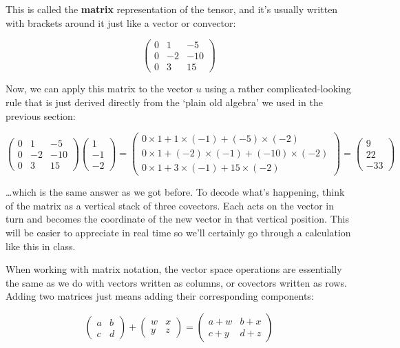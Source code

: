 \documentclass[oneside,english]{amsbook}
\numberwithin{section}{chapter}
\theoremstyle{plain}
\theoremstyle{definition}
\begin{document}
This is called the \textbf{matrix} representation of the tensor, and
it's usually written with brackets around it just like a vector or
convector:

\[\begin{pmatrix}
	0 & 1 & - 5 \\
	0 & - 2 & - 10 \\
	0 & 3 & 15
\end{pmatrix}\]

Now, we can apply this matrix to the vector $u$ using a rather
complicated-looking rule that is just derived directly from the `plain
old algebra' we used in the previous section:

\[\begin{pmatrix}
	0 & 1 & - 5 \\
	0 & - 2 & - 10 \\
	0 & 3 & 15
\end{pmatrix}\begin{pmatrix}
	1 \\
	- 1 \\
	- 2
\end{pmatrix} = \begin{pmatrix}
	0 \times 1 + 1 \times ( - 1) + ( - 5) \times ( - 2) \\
	0 \times 1 + ( - 2) \times ( - 1) + ( - 10) \times ( - 2) \\
	0 \times 1 + 3 \times ( - 1) + 15 \times ( - 2)
\end{pmatrix} = \begin{pmatrix}
	9 \\
	22 \\
	- 33
\end{pmatrix}\]

\ldots which is the same answer as we got before. To decode what's
happening, think of the matrix as a vertical stack of three covectors.
Each acts on the vector in turn and becomes the coordinate of the new
vector in that vertical position. This will be easier to appreciate in
real time so we'll certainly go through a calculation like this in
class.

When working with matrix notation, the vector space operations are
essentially the same as we do with vectors written as columns, or
covectors written as rows. Adding two matrices just means adding their
corresponding components:

\[\begin{pmatrix}
	a & b \\
	c & d
\end{pmatrix} + \begin{pmatrix}
	w & x \\
	y & z
\end{pmatrix} = \begin{pmatrix}
	a + w & b + x \\
	c + y & d + z
\end{pmatrix}\]
\end{document}
